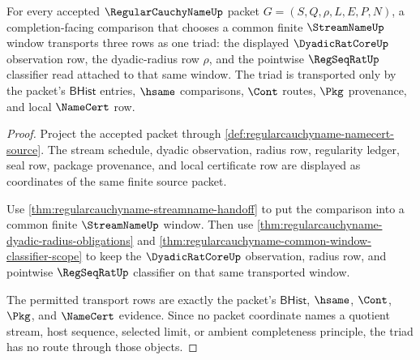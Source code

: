 \begin{theorem}
\label{thm:regularcauchyname-common-window-transport-triad}
For every accepted $\RegularCauchyNameUp$ packet $G=(S,Q,\rho,L,E,P,N)$, a completion-facing comparison that chooses a common finite $\StreamNameUp$ window transports three rows as one triad: the displayed $\DyadicRatCoreUp$ observation row, the dyadic-radius row $\rho$, and the pointwise $\RegSeqRatUp$ classifier read attached to that same window. The triad is transported only by the packet's $\mathsf{BHist}$ entries, $\hsame$ comparisons, $\Cont$ routes, $\Pkg$ provenance, and local $\NameCert$ row.
\end{theorem}
\begin{proof}
Project the accepted packet through \autoref{def:regularcauchyname-namecert-source}. The stream schedule, dyadic observation, radius row, regularity ledger, seal row, package provenance, and local certificate row are displayed as coordinates of the same finite source packet.

Use \autoref{thm:regularcauchyname-streamname-handoff} to put the comparison into a common finite $\StreamNameUp$ window. Then use \autoref{thm:regularcauchyname-dyadic-radius-obligations} and \autoref{thm:regularcauchyname-common-window-classifier-scope} to keep the $\DyadicRatCoreUp$ observation, radius row, and pointwise $\RegSeqRatUp$ classifier on that same transported window.

The permitted transport rows are exactly the packet's $\mathsf{BHist}$, $\hsame$, $\Cont$, $\Pkg$, and $\NameCert$ evidence. Since no packet coordinate names a quotient stream, host sequence, selected limit, or ambient completeness principle, the triad has no route through those objects.
\end{proof}

